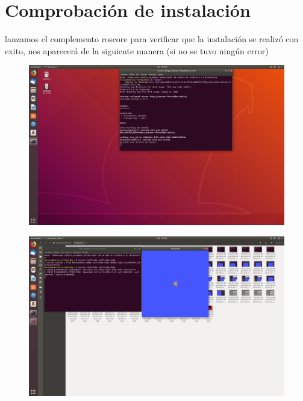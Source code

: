 \documentclass[11pt,a4paper,oldfontcommands]{memoir}
\begin{document}
\chapter{Comprobación de instalación}
lanzamos el complemento roscore para verificar que la instalación se realizó con exito, nos aparecerá de la siguiente manera (si no se tuvo ningún error)
\begin{figure}[h]
\includegraphics[scale=.15]{link21.png}
\end{figure}
\begin{figure}[h]
\includegraphics[scale=.15]{link23.png}
\end{figure}



\end{document}
